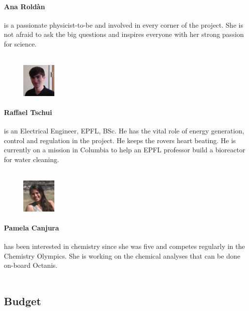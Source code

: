 \documentclass[a4paper,12pt]{article}
\begin{document}
\paragraph{Ana Roldàn} is a passionate physicist-to-be and involved in every corner of the project. She is not afraid to ask the big questions and inspires everyone with her strong passion for science.
\\ \\

\begin{figure}
     \centering
     \vspace{-13pt}
    \includegraphics[width=0.15\textwidth]{raf}
\end{figure} 
\paragraph{Raffael Tschui} is an Electrical Engineer, EPFL, BSc. He has the vital role of energy generation, control and regulation in the project. He keeps the rovers heart beating. He is currently on a mission in Columbia to help an EPFL professor build a bioreactor for water cleaning.
\\ \\

\begin{figure}
    \centering
    \vspace{-13pt}
    \includegraphics[width=0.15\textwidth]{pam}
\end{figure} 
\paragraph{Pamela Canjura} has been interested in chemistry since she was five and competes regularly in the Chemistry Olympics. She is working on the chemical analyses that can be done on-board Octanis.
\\ \\


\subsection{Budget}
\end{document}
